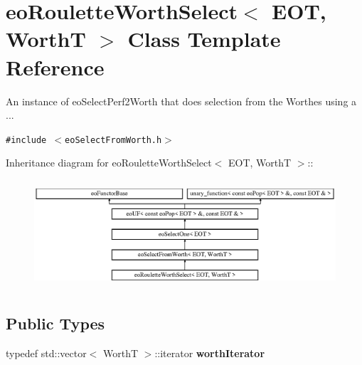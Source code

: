 \section{eo\-Roulette\-Worth\-Select$<$ EOT, Worth\-T $>$ Class Template Reference}
\label{classeo_roulette_worth_select}
An instance of eo\-Select\-Perf2Worth that does selection from the Worthes using a ...  


{\tt \#include $<$eo\-Select\-From\-Worth.h$>$}

Inheritance diagram for eo\-Roulette\-Worth\-Select$<$ EOT, Worth\-T $>$::\begin{figure}[H]
\begin{center}
\leavevmode
\includegraphics[height=4.04624cm]{classeo_roulette_worth_select}
\end{center}
\end{figure}
\subsection*{Public Types}
\begin{CompactItemize}
\item 
typedef std::vector$<$ Worth\-T $>$::iterator {\bf worth\-Iterator}\label{classeo_roulette_worth_select_w0}

\end{CompactItemize}
